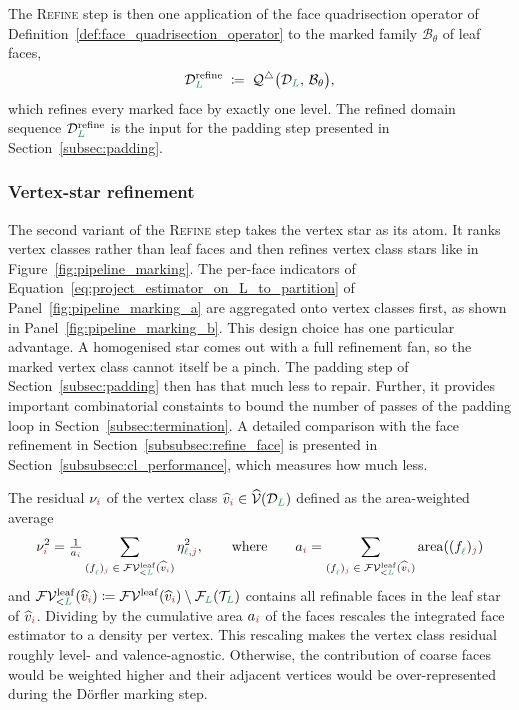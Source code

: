\documentclass[a4paper, 12pt]{article}
\makeatletter
\newcommand{\quadriF}{\mathcal{Q}^{\triangle}}                   %
\newcommand{\green}{\color{ForestGreen}}
\newcommand{\brickred}{\color{BrickRed}}
\newcommand{\T}{\mathcal{T}}
\newcommand{\V}{\mathcal{V}}
\newcommand{\F}{\mathcal{F}}
\newcommand{\vertexClass}[1]{\widehat{v}_{#1}}
\newcommand{\vertexClasses}{\widehat{\V}}
\newcommand{\face}[2]{\freeQ{f}{}{#1}{#2}}
\newcommand{\coarseIdxone}{{\brickred i}}
\newcommand{\fineIdxone}{{\brickred j}}
\renewcommand{\l}{{\green\ell}}
\renewcommand{\L}{{\green L}}
\newcommand{\B}{\mathcal{B}}
\newcommand{\freeQ}[4]{ ( {#1}^{#2}_{#3} )_{#4}}
\theoremstyle{definition}
\theoremstyle{plain}
\numberwithin{equation}{section}
\DeclareRobustCommand{\domseq}[1][]{\mathcal{D}\ifx\@empty#1\@empty\else_{#1}\fi}
\newcommand{\FVleaf}[1]{\F\V^{\mathrm{leaf}}_{#1}}          %
\makeatother
\begin{document}
The \textsc{Refine} step is then one application of the face quadrisection operator of Definition~\ref{def:face_quadrisection_operator} to the marked family $\B_\theta$ of leaf faces,
\begin{equation}
    \label{eq:refine_faces}
    \domseq[\L]^{\mathrm{refine}} \; \coloneq \; \quadriF \big( \domseq[\L], \, \B_\theta \big) ,
\end{equation}
which refines every marked face by exactly one level. The refined domain sequence $\domseq[\L]^{\mathrm{refine}}$ is the input for the padding step presented in Section~\ref{subsec:padding}.

\FloatBarrier

\subsubsection{Vertex-star refinement}
\label{subsubsec:refine_vertex}

The second variant of the \textsc{Refine} step takes the vertex star as its atom. It ranks vertex classes rather than leaf faces and then refines vertex class stars like in Figure~\ref{fig:pipeline_marking}. The per-face indicators of Equation~\eqref{eq:project_estimator_on_L_to_partition} of Panel~\ref{fig:pipeline_marking_a} are aggregated onto vertex classes first, as shown in Panel~\ref{fig:pipeline_marking_b}. This design choice has one particular advantage. A homogenised star comes out with a full refinement fan, so the marked vertex class cannot itself be a pinch. The padding step of Section~\ref{subsec:padding} then has that much less to repair. Further, it provides important combinatorial constaints to bound the number of passes of the padding loop in Section~\ref{subsec:termination}. A detailed comparison with the face refinement in Section~\ref{subsubsec:refine_face} is presented in Section~\ref{subsubsec:cl_performance}, which measures how much less.

\newcommand{\vertClassResidual}[1]{\nu_{#1}}
The residual $\vertClassResidual{\coarseIdxone}$ of the vertex class $\vertexClass{\coarseIdxone} \in \vertexClasses(\domseq[\L])$ defined as the area-weighted average
\begin{equation}
    \label{eq:vertex_residual}
    \nu^2_\coarseIdxone = \tfrac{1}{a_\coarseIdxone} \sum\limits_{\face{\l}{\fineIdxone} \; \in \; \FVleaf{<\L}(\vertexClass{\coarseIdxone})} \eta^2_{\l,\fineIdxone},
    \qquad \mathrm{where} \qquad
    a_\coarseIdxone = \sum\limits_{\face{\l}{\fineIdxone} \; \in \; \FVleaf{<\L}(\vertexClass{\coarseIdxone})} \mathrm{area}(\face{\l}{\fineIdxone})
\end{equation}
and $\FVleaf{<\L}(\vertexClass{\coarseIdxone}) \coloneq \FVleaf{}(\vertexClass{\coarseIdxone}) \setminus \F_\L(\T_\L)$ contains all refinable faces in the leaf star of $\vertexClass{\coarseIdxone}$. Dividing by the cumulative area $a_\coarseIdxone$ of the faces rescales the integrated face estimator to a density per vertex. This rescaling makes the vertex class residual roughly level- and valence-agnostic. Otherwise, the contribution of coarse faces would be weighted higher and their adjacent vertices would be over-represented during the Dörfler marking step.
\end{document}
